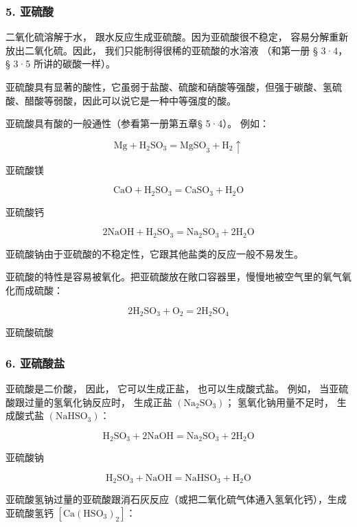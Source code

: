 \subsubsection{5. 亚硫酸}

二氧化硫溶解于水， 跟水反应生成亚硫酸。因为亚硫酸很不稳定，
容易分解重新放出二氧化硫。因此， 我们只能制得很稀的亚硫酸的水溶液
（和第一册 § 3·4， § 3·5 所讲的碳酸一样）。

亚硫酸具有显著的酸性，它虽弱于盐酸、硫酸和硝酸等强酸，但强于碳酸、氢硫酸、醋酸等弱酸，因此可以说它是一种中等强度的酸。

亚硫酸具有酸的一般通性（参看第一册第五章§ 5·4）。 例如：

\[
\mathrm{Mg} + \mathrm{H} _ {2} \mathrm{SO} _ {3} = \mathrm{MgSO} _ {3} + \mathrm{H} _ {2} \uparrow
\]

亚硫酸镁

\[
\mathrm{CaO} + \mathrm{H} _ {2} \mathrm{SO} _ {3} = \mathrm{CaSO} _ {3} + \mathrm{H} _ {2} \mathrm{O}
\]

亚硫酸钙

\[
2 \mathrm{NaOH} + \mathrm{H} _ {2} \mathrm{SO} _ {3} = \mathrm{Na} _ {2} \mathrm{SO} _ {3} + 2 \mathrm{H} _ {2} \mathrm{O}
\]

亚硫酸钠由于亚硫酸的不稳定性，它跟其他盐类的反应一般不易发生。

亚硫酸的特性是容易被氧化。把亚硫酸放在敞口容器里，慢慢地被空气里的氧气氧化而成硫酸：

\[
2 \mathrm{H} _ {2} \mathrm{SO} _ {3} + \mathrm{O} _ {2} = 2 \mathrm{H} _ {2} \mathrm{SO} _ {4}
\]

亚硫酸硫酸

\subsubsection{6. 亚硫酸盐}

亚硫酸是二价酸， 因此， 它可以生成正盐， 也可以生成酸式盐。 例如，
当亚硫酸跟过量的氢氧化钠反应时， 生成正盐
\(\left(\mathrm{Na}_{2} \mathrm{SO}_{3}\right)\)； 氢氧化钠用量不足时，
生成酸式盐 \(\left(\mathrm{NaHSO}_{3}\right)\)：

\[
\mathrm{H} _ {2} \mathrm{SO} _ {3} + 2 \mathrm{NaOH} = \mathrm{Na} _ {2} \mathrm{SO} _ {3} + 2 \mathrm{H} _ {2} \mathrm{O}
\]

亚硫酸钠

\[
\mathrm{H} _ {2} \mathrm{SO} _ {3} + \mathrm{NaOH} = \mathrm{NaHSO} _ {3} + \mathrm{H} _ {2} \mathrm{O}
\]

亚硫酸氢钠过量的亚硫酸跟消石灰反应（或把二氧化硫气体通入氢氧化钙），生成亚硫酸氢钙
\(\left[\mathrm{Ca}\left(\mathrm{HSO}_{3}\right)_{2}\right]\)：

